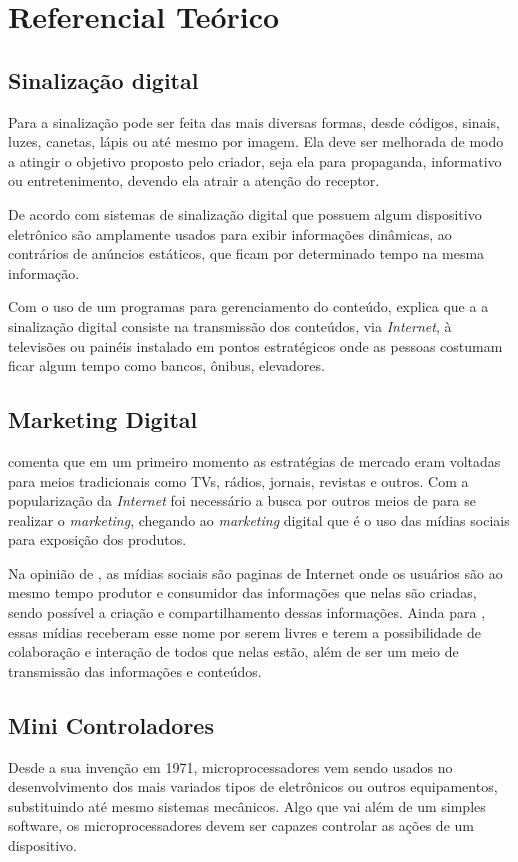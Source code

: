 \chapter[Referencial Teórico]{Referencial Teórico}
\section{Sinalização digital}
Para \cite{munari2006} a sinalização pode ser feita das mais diversas formas, desde códigos, sinais, luzes, canetas, lápis ou até mesmo por imagem. Ela deve ser melhorada de modo a  atingir o objetivo proposto pelo criador, seja ela para propaganda, informativo ou entretenimento, devendo ela atrair a atenção do receptor. 

De acordo com \cite{mishima2016} sistemas de sinalização digital que possuem algum dispositivo eletrônico são amplamente usados para exibir informações dinâmicas, ao contrários de anúncios estáticos, que ficam por determinado tempo na mesma informação. 

Com o uso de um programas para gerenciamento do conteúdo, \cite{machado2010} explica que a a sinalização digital consiste na transmissão dos conteúdos, via \textit{Internet}, à televisões ou painéis instalado em pontos estratégicos onde as pessoas costumam ficar algum tempo como bancos, ônibus, elevadores.

\section{Marketing Digital}
\cite{santos2014} comenta que em um primeiro momento as estratégias de mercado eram voltadas para meios tradicionais como TVs, rádios, jornais, revistas e outros. Com a popularização da \textit{Internet} foi necessário a busca por outros meios de para se realizar o \textit{marketing}, chegando ao \textit{marketing} digital que é o uso das mídias sociais para exposição dos produtos.

Na opinião de \cite{torres2000}, as mídias sociais são paginas de Internet onde os usuários são ao mesmo tempo produtor e consumidor das informações que nelas são criadas, sendo possível a criação e compartilhamento dessas informações. Ainda para \cite{torres2000}, essas mídias receberam esse nome por serem livres e terem a possibilidade de colaboração e interação de todos que nelas estão, além de ser um meio de transmissão das informações e conteúdos.

\section{Mini Controladores}
Desde a sua invenção em 1971, microprocessadores vem sendo usados no desenvolvimento dos mais variados tipos de eletrônicos ou outros equipamentos, substituindo até mesmo sistemas mecânicos. Algo que vai além de um simples software, os microprocessadores devem ser capazes controlar as ações de um dispositivo. \cite{rosenstark2007}

